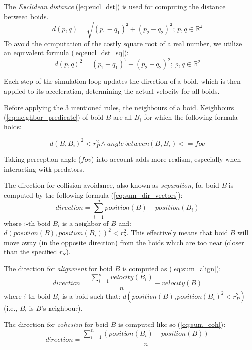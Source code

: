 \documentclass[9pt]{pnas-new}
\begin{document}
\noindent The {\em Euclidean distance} (\ref{eq:eucl_dst}) is used for computing the distance between boids.
\begin{equation} \label{eq:eucl_dst}
	d(p, q) = \sqrt{(p_1-q_1)^2 + (p_2 - q_2)^2};\  p, q \in \mathbb{R}^2
\end{equation}
To avoid the computation of the costly square root of a real number, we utilize an equivalent formula
(\ref{eq:eucl_dst_sq}):
\begin{equation} \label{eq:eucl_dst_sq}
	d(p, q)^2 = (p_1-q_1)^2 + (p_2 - q_2)^2;\  p, q \in \mathbb{R}^2
\end{equation}

Each step of the simulation loop updates the direction of a boid, which is then applied to its acceleration,
determining the actual velocity for all boids.

Before applying the 3 mentioned rules, the neighbours of a boid.
Neighbours (\ref{eq:neighbor_predicate}) of boid $ B $ are all $B_i$ for which the following formula holds:

\begin{equation} \label{eq:neighbor_predicate}
	d(B, B_i)^2 < r_P^2 \land angle\ between(B, B_i) <= fov
\end{equation}

Taking perception angle ($fov$) into account adds more realism, especially when interacting with predators.

The direction for collision avoidance, also known as {\em separation}, for boid $B$ is computed by the
following formula (\ref{eq:sum_dir_vectors}):
\begin{equation} \label{eq:sum_dir_vectors}
	direction = \sum_{i=1}^{n} position(B) - position(B_i)
\end{equation}
where $i$-th boid $B_i$ is a neighbor of $B$ and: $ d(position(B), position(B_i))^2 < r_S^2 $.
This effectively means that boid $B$ will move away (in the opposite direction) from the boids which are too near (closer than the specified $r_S$).

The direction for {\em alignment} for boid $B$ is computed as (\ref{eq:sum_align}):
\begin{equation} \label{eq:sum_align}
	direction = \frac{\sum_{i=1}^{n} velocity(B_i)}{n} - velocity(B)
\end{equation}
where $i$-th boid $B_i$ is a boid such that: $ d(position(B), position(B_i)^2 < r_P^2) $ (i.e., $B_i$ is $B$'s neighbour).

The direction for {\em cohesion} for boid $B$ is computed like so (\ref{eq:sum_coh}):
\begin{equation} \label{eq:sum_coh}
	direction =  \frac{\sum_{i=1}^{n} \left(position(B_i) - position(B)\right)}{n}
\end{equation}
\end{document}
